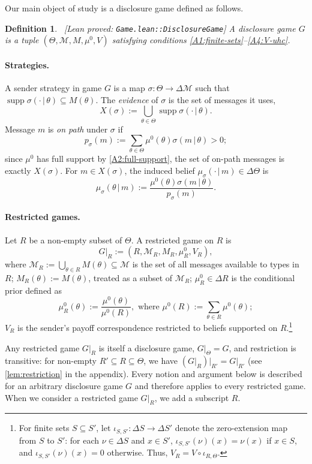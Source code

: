 \documentclass[11pt]{article}
\newtheorem{definition}{Definition}
\newcommand{\sep}{\,|\,}
\newcommand{\supp}{\operatorname{supp}}
\newcommand{\Msg}{\mathcal{M}}
\newcommand{\wT}{R}
\newcommand{\leanproved}[1]{{\footnotesize\textsf{\textcolor{green!55!black}{[Lean proved: \texttt{#1}]}}}}
\begin{document}
Our main object of study is a disclosure game defined as follows.
\begin{definition}\label{dfn:game}\ \leanproved{Game.lean::DisclosureGame}
    A \emph{disclosure game} $G$ is a tuple $(\Theta,\Msg,M,\mu^0,V)$ satisfying conditions \cref{A1:finite-sets}--\cref{A4:V-uhc}.
\end{definition}

\paragraph{Strategies.} A sender strategy in game $G$ is a map $\sigma: \Theta \to \Delta \Msg$ such that $\supp \sigma(\cdot \sep \theta) \subseteq M(\theta)$. The \emph{evidence} of $\sigma$ is the set of messages it uses,
\[
    X(\sigma) := \bigcup_{\theta \in\Theta} \supp \sigma(\cdot \sep \theta).
\]
Message $m$ is \emph{on path} under $\sigma$ if
\[
    p_\sigma(m) := \sum_{\theta \in \Theta} \mu^0(\theta) \sigma(m \sep \theta) > 0;
\]
since $\mu^0$ has full support by \cref{A2:full-support}, the set of on-path messages is exactly $X(\sigma)$. For $m \in X(\sigma)$, the induced belief $\mu_\sigma(\cdot \sep m) \in \Delta \Theta$ is
\[
    \mu_\sigma (\theta \sep m) := \frac{\mu^0(\theta) \sigma(m \sep \theta)}{p_\sigma(m)}.
\]

\paragraph{Restricted games.} Let $\wT$ be a non-empty subset of $\Theta$. A restricted game on $\wT$ is
\[
    G \vert_{\wT} := (\wT, \Msg_{\wT}, M_{\wT}, \mu^0_{\wT}, V_{\wT}),
\]
where $\Msg_{\wT} := \bigcup_{\theta \in \wT} M(\theta) \subseteq \Msg$ is the set of all messages available to types in $\wT$; $M_{\wT}(\theta) := M(\theta)$, treated as a subset of $\Msg_{\wT}$; $\mu^0_{\wT} \in \Delta \wT$ is the conditional prior defined as
\[
    \mu^0_{\wT}(\theta) := \frac{\mu^0(\theta)}{ \mu^0(\wT) }, \text{ where } \mu^0(\wT) := \sum_{\theta \in \wT} \mu^0(\theta);
\]
$V_{\wT}$ is the sender's payoff correspondence restricted to beliefs supported on $\wT$.\footnote{For finite sets $S \subseteq S'$, let $\iota_{S,S'}: \Delta S \to \Delta S'$ denote the zero-extension map from $S$ to $S'$: for each $\nu \in \Delta S$ and $x \in S'$, $\iota_{S,S'}(\nu)(x)=\nu(x)$ if $x \in S$, and $\iota_{S,S'}(\nu)(x)=0$ otherwise. Thus, $V_{\wT} = V \circ \iota_{\wT,\Theta}$.}

Any restricted game $G \vert_{\wT}$ is itself a disclosure game, $G \vert_{\Theta} = G$, and restriction is transitive: for non-empty $\wT' \subseteq \wT \subseteq \Theta$, we have $(G \vert_{\wT})\vert_{\wT '} = G \vert_{\wT '}$ (see \cref{lem:restriction} in the appendix). Every notion and argument below is described for an arbitrary disclosure game $G$ and therefore applies to every restricted game. When we consider a restricted game $G \vert_{\wT}$, we add a subscript $\wT$.
\end{document}

